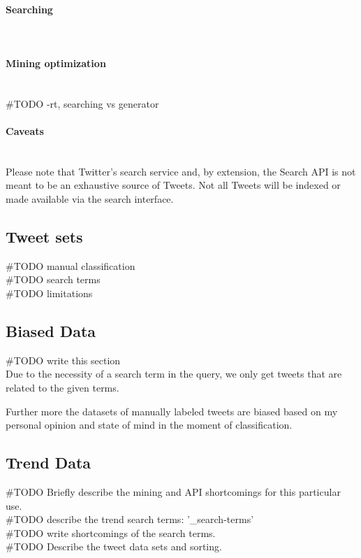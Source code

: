 \paragraph{Searching}
\hspace{0pt}\\

%

\paragraph{Mining optimization}
\hspace{0pt}\\
#TODO -rt, searching vs generator\\ 
%

\paragraph{Caveats}
\hspace{0pt}\\
Please note that Twitter's search service and, by extension, the Search API is
not meant to be an exhaustive source of Tweets. Not all Tweets will be indexed
or made available via the search interface.
%

\subsection{Tweet sets}
#TODO manual classification\\
#TODO search terms\\
#TODO limitations\\
%

\subsection{Biased Data}
#TODO write this section\\
Due to the necessity of a search term in the query, we only get tweets that are
related to the given terms.

Further more the datasets of manually labeled tweets are biased based on my
personal opinion and state of mind in the moment of classification.  

\subsection{Trend Data}
#TODO Briefly describe the mining and API shortcomings for this particular
use.\\
#TODO describe the trend search terms: '\_search-terms'\\
#TODO write shortcomings of the search terms. \\
#TODO Describe the tweet data sets and sorting. \\ 

